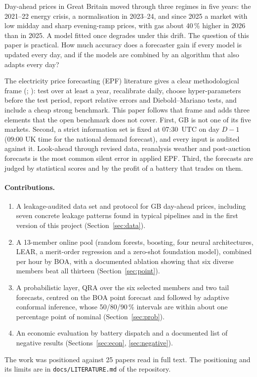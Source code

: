\documentclass[11pt,a4paper]{article}
\begin{document}
Day-ahead prices in Great Britain moved through three regimes in five years: the 2021--22 energy crisis, a normalisation in 2023--24, and since 2025 a market with low midday and sharp evening-ramp prices, with gas about 40\,\% higher in 2026 than in 2025. A model fitted once degrades under this drift. The question of this paper is practical. How much accuracy does a forecaster gain if every model is updated every day, and if the models are combined by an algorithm that also adapts every day?

The electricity price forecasting (EPF) literature gives a clear methodological frame (\citealp{lago2021}; \citealp{weron2014}): test over at least a year, recalibrate daily, choose hyper-parameters before the test period, report relative errors and Diebold--Mariano tests, and include a cheap strong benchmark. This paper follows that frame and adds three elements that the open benchmark does not cover. First, GB is not one of its five markets. Second, a strict information set is fixed at 07:30~UTC on day $D\!-\!1$ (09:00 UK time for the national demand forecast), and every input is audited against it. Look-ahead through revised data, reanalysis weather and post-auction forecasts is the most common silent error in applied EPF. Third, the forecasts are judged by statistical scores and by the profit of a battery that trades on them.

\paragraph{Contributions.}
\begin{enumerate}
\item A leakage-audited data set and protocol for GB day-ahead prices, including seven concrete leakage patterns found in typical pipelines and in the first version of this project (Section~\ref{sec:data}).
\item A 13-member online pool (random forests, boosting, four neural architectures, LEAR, a merit-order regression and a zero-shot foundation model), combined per hour by BOA, with a documented ablation showing that six diverse members beat all thirteen (Section~\ref{sec:point}).
\item A probabilistic layer, QRA over the six selected members and two tail forecasts, centred on the BOA point forecast and followed by adaptive conformal inference, whose 50/80/90\,\% intervals are within about one percentage point of nominal (Section~\ref{sec:prob}).
\item An economic evaluation by battery dispatch and a documented list of negative results (Sections~\ref{sec:econ}, \ref{sec:negative}).
\end{enumerate}
The work was positioned against 25 papers read in full text. The positioning and its limits are in \texttt{docs/LITERATURE.md} of the repository.
\end{document}
